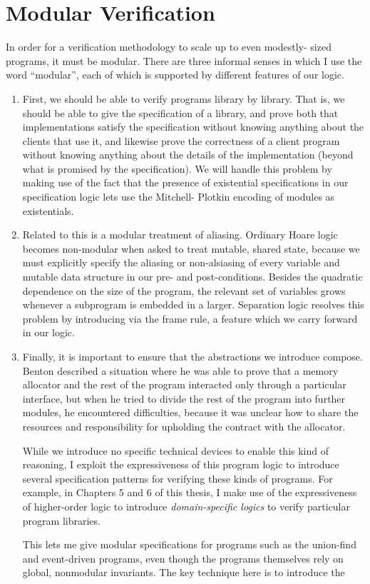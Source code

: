 \section{Modular Verification}

In order for a verification methodology to scale up to even modestly-
sized programs, it must be modular. There are three informal senses in
which I use the word ``modular'', each of which is supported by
different features of our logic.

\begin{enumerate}
\item First, we should be able to verify programs library by
  library. That is, we should be able to give the specification of a
  library, and prove both that implementations satisfy the
  specification without knowing anything about the clients that
  use it, and likewise prove the correctness of a client program
  without knowing anything about the details of the implementation
  (beyond what is promised by the specification). We will handle this
  problem by making use of the fact that the presence of existential
  specifications in our specification logic lets  use the Mitchell-
  Plotkin encoding of modules as existentials. 

\item Related to this is a modular treatment of aliasing. Ordinary
  Hoare logic becomes non-modular when asked to treat mutable, shared
  state, because we must explicitly specify the aliasing or
  non-alsiasing of every variable and mutable data structure in our
  pre- and post-conditions. Besides the quadratic dependence on the
  size of the program, the relevant set of variables grows whenever a
  subprogram is embedded in a larger. Separation logic resolves this
  problem by introducing via the frame rule, a feature which we carry
  forward in our logic.

\item Finally, it is important to ensure that the abstractions we
  introduce compose. Benton\cite{benton-modularity} described a
  situation where he was able to prove that a memory allocator and the
  rest of the program interacted only through a particular interface,
  but when he tried to divide the rest of the program into further
  modules, he encountered difficulties, because it was unclear how to
  share the resources and responsibility for upholding the contract
  with the allocator.

  While we introduce no specific technical devices to enable this kind
  of reasoning, I exploit the expressiveness of this program logic to
  introduce several specification patterns for verifying these kinds
  of programs. For example, in Chapters 5 and 6 of this thesis, I make
  use of the expressiveness of higher-order logic to introduce
  \emph{domain-specific logics} to verify particular program
  libraries.
  
  This lets me give modular specifications for programs such as the 
  union-find~\citep{union-find} and event-driven programs, even though
  the programs themselves rely on global, nonmodular invariants. The 
  key technique here is to introduce the 
\end{enumerate}



